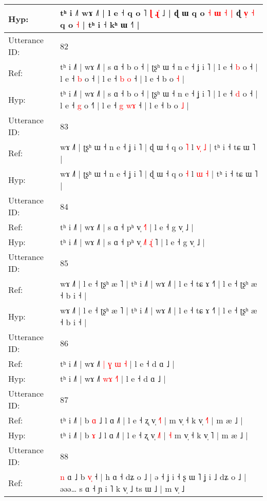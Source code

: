 \documentclass[10pt]{article}
\DeclareRobustCommand{\hl}[1]{{\textcolor{red}{#1}}}
\begin{document}
\begin{longtable}{ll}
 \\
Hyp: & tʰ i ˩˥\hl{}\hl{} wɤ ˩˥ | l e ˧ q o ˥ \hl{ɭ} \hl{ɻ}\hl{̍} ˩ | ɖ ɯ\hl{}\hl{} q o \hl{˧} \hl{ɯ} \hl{}\hl{˧} \hl{|} ɖ \hl{v}\hl{̩} \hl{˧} q o\hl{}\hl{}\hl{}\hl{}\hl{}\hl{}\hl{} \hl{˧} | tʰ i ˧ kʰ ɯ ˧˥ |
 \\
\midrule
Utterance ID: & 82 \\
Ref: & tʰ i ˩˥ | wɤ ˩˥ | s ɑ ˧ b o ˧ | ʈʂʰ ɯ ˧ n e ˧ ʝ i ˥ | l e ˧ \hl{b} o ˧ | l e ˧ \hl{b} o ˧\hl{} | l e ˧ \hl{b} \hl{}\hl{o} ˧ | l e ˧ b o \hl{˧} |
 \\
Hyp: & tʰ i ˩˥ | wɤ ˩˥ | s ɑ ˧ b o ˧ | ʈʂʰ ɯ ˧ n e ˧ ʝ i ˥ | l e ˧ \hl{d} o ˧ | l e ˧ \hl{g} o ˧\hl{˥} | l e ˧ \hl{g} \hl{w}\hl{ɤ} ˧ | l e ˧ b o \hl{˩} |
 \\
\midrule
Utterance ID: & 83 \\
Ref: & wɤ ˩˥ | ʈʂʰ ɯ ˧ n e ˧ ʝ i ˥ | ɖ ɯ ˧ q o \hl{˥} l \hl{v}\hl{̩} \hl{˩} | tʰ i ˧ tɕ ɯ ˥ |
 \\
Hyp: & wɤ ˩˥ | ʈʂʰ ɯ ˧ n e ˧ ʝ i ˥ | ɖ ɯ ˧ q o \hl{˧} l \hl{}\hl{ɯ} \hl{˧} | tʰ i ˧ tɕ ɯ ˥ |
 \\
\midrule
Utterance ID: & 84 \\
Ref: & tʰ i ˩˥ | wɤ ˩˥ | s ɑ ˧ pʰ v̩\hl{}\hl{}\hl{} \hl{}\hl{}\hl{˧}˥ | l e ˧ g v̩ ˩ |
 \\
Hyp: & tʰ i ˩˥ | wɤ ˩˥ | s ɑ ˧ pʰ v̩\hl{ }\hl{˩}\hl{˥} \hl{ɻ}\hl{̍}\hl{ }˥ | l e ˧ g v̩ ˩ |
 \\
\midrule
Utterance ID: & 85 \\
Ref: & wɤ ˩˥ | l e ˧ ʈʂʰ æ ˥ | tʰ i ˩˥ | wɤ ˩˥ | l e ˧ tɕ ɤ ˧˥ | l e ˧ ʈʂʰ æ ˧ b i ˧ |
 \\
Hyp: & wɤ ˩˥ | l e ˧ ʈʂʰ æ ˥ | tʰ i ˩˥ | wɤ ˩˥ | l e ˧ tɕ ɤ ˧˥ | l e ˧ ʈʂʰ æ ˧ b i ˧ |
 \\
\midrule
Utterance ID: & 86 \\
Ref: & tʰ i ˩˥ | wɤ ˩˥ \hl{|}\hl{ }\hl{ɣ} \hl{ɯ}\hl{ }\hl{˧} | l e ˧ d ɑ ˩ |
 \\
Hyp: & tʰ i ˩˥ | wɤ ˩˥ \hl{}\hl{w}\hl{ɤ} \hl{}\hl{˧}\hl{˥} | l e ˧ d ɑ ˩ |
 \\
\midrule
Utterance ID: & 87 \\
Ref: & tʰ i ˩˥ | b \hl{ɑ} ˩ l ɑ ˩˥ | l e ˧ ʐ v̩ \hl{˧}˥ |\hl{}\hl{} m v̩ ˧ k v̩ \hl{˧}˥ | m æ ˩ |
 \\
Hyp: & tʰ i ˩˥ | b \hl{ɤ} ˩ l ɑ ˩˥ | l e ˧ ʐ v̩ \hl{˩}˥ |\hl{ }\hl{˧} m v̩ ˧ k v̩ \hl{}˥ | m æ ˩ |
 \\
\midrule
Utterance ID: & 88 \\
Ref: & \hl{n} ɑ ˩ b \hl{v}\hl{̩} ˧ | h ɑ ˧ dʑ o ˩ | ə ˧ ʝ i ˧ ʂ ɯ ˥ ʝ i ˩ dʑ o ˩ | əəə… s ɑ ˧ ɲ i ˥ k v̩ ˩ ts ɯ ˩ | m v̩ ˩

\end{longtable}
\end{document}
